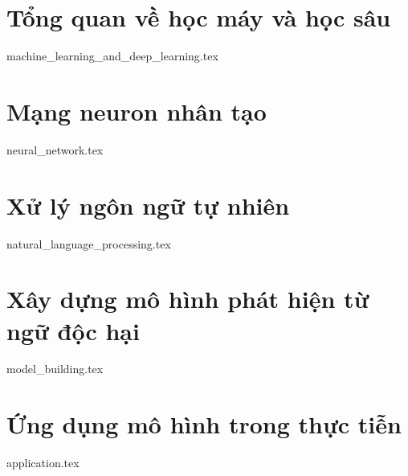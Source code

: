 \section{Tổng quan về học máy và học sâu}
{machine_learning_and_deep_learning.tex}

\section{Mạng neuron nhân tạo}
{neural_network.tex}

\section{Xử lý ngôn ngữ tự nhiên}
{natural_language_processing.tex}

\section{Xây dựng mô hình phát hiện từ ngữ độc hại}
{model_building.tex}

\section{Ứng dụng mô hình trong thực tiễn}
{application.tex}

